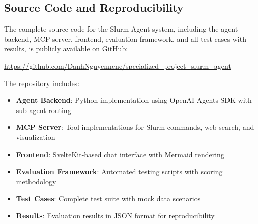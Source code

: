 \subsection{Source Code and Reproducibility}

The complete source code for the Slurm Agent system, including the agent backend, MCP server, frontend, evaluation framework, and all test cases with results, is publicly available on GitHub:

\begin{center}
    \url{https://github.com/DanhNguyennene/specialized_project_slurm_agent}
\end{center}

The repository includes:
\begin{itemize}
    \item \textbf{Agent Backend}: Python implementation using OpenAI Agents SDK with sub-agent routing
    \item \textbf{MCP Server}: Tool implementations for Slurm commands, web search, and visualization
    \item \textbf{Frontend}: SvelteKit-based chat interface with Mermaid rendering
    \item \textbf{Evaluation Framework}: Automated testing scripts with scoring methodology
    \item \textbf{Test Cases}: Complete test suite with mock data scenarios
    \item \textbf{Results}: Evaluation results in JSON format for reproducibility
\end{itemize}
